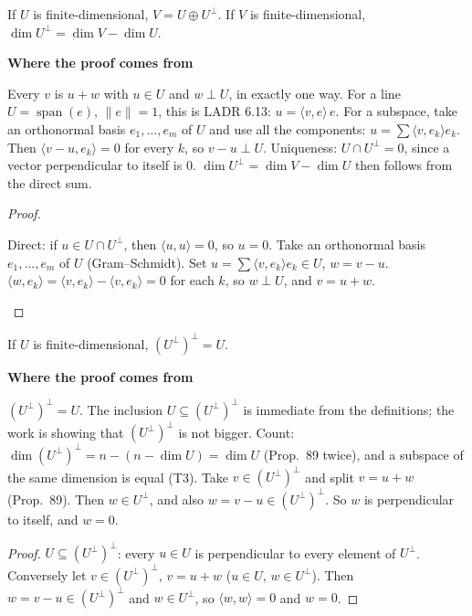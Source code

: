 \documentclass[10pt]{scrartcl}
\DeclareMathOperator{\spn}{span}
\newcommand{\ip}[2]{\langle #1,#2\rangle}
\newenvironment{motive}{\begin{mdframed}[style=thinkbox]\textbf{\color{OliveGreen!75!black}Where the proof comes from}\begin{description}[leftmargin=0.9em,labelindent=0pt,itemsep=2pt,topsep=2pt,font=\normalfont\bfseries\color{OliveGreen!70!black}]}{\end{description}\end{mdframed}}
\newenvironment{steps}{\begin{enumerate}[label=\arabic*.,leftmargin=1.5em,itemsep=2pt,topsep=2pt]}{\end{enumerate}}
\begin{document}
\begin{theorem*}
  If $U$ is finite-dimensional, $V=U\oplus U^\perp$. If $V$ is finite-dimensional, $\dim U^\perp=\dim V-\dim U$.
\end{theorem*}
\begin{motive}
  \ii[Want.] Every $v$ is $u+w$ with $u\in U$ and $w\perp U$, in exactly one way.
  \ii[Know.] For a line $U=\spn(e)$, $\|e\|=1$, this is LADR 6.13: $u=\ip ve\,e$.
   For a subspace, take an orthonormal basis $e_1,\dots,e_m$ of $U$ and use all the components: $u=\sum\ip v{e_k}e_k$. Then $\ip{v-u}{e_k}=0$ for every $k$, so $v-u\perp U$. Uniqueness: $U\cap U^\perp=0$, since a vector perpendicular to itself is $0$.
  \ii[Dimension.] $\dim U^\perp=\dim V-\dim U$ then follows from the direct sum.
\end{motive}
\begin{proof}
  \begin{steps}
    \ii Direct: if $u\in U\cap U^\perp$, then $\ip uu=0$, so $u=0$.
    \ii Take an orthonormal basis $e_1,\dots,e_m$ of $U$ (Gram--Schmidt). Set $u=\sum\ip v{e_k}e_k\in U$, $w=v-u$.
    \ii $\ip w{e_k}=\ip v{e_k}-\ip v{e_k}=0$ for each $k$, so $w\perp U$, and $v=u+w$.
  \end{steps}
\end{proof}

\begin{proposition*}
  If $U$ is finite-dimensional, $(U^\perp)^\perp=U$.
\end{proposition*}
\begin{motive}
  \ii[Want.] $(U^\perp)^\perp=U$. The inclusion $U\subseteq(U^\perp)^\perp$ is immediate from the definitions; the work is showing that $(U^\perp)^\perp$ is not bigger.
   Count: $\dim(U^\perp)^\perp=n-(n-\dim U)=\dim U$ (Prop.~89 twice), and a subspace of the same dimension is equal (T3).
   Take $v\in(U^\perp)^\perp$ and split $v=u+w$ (Prop.~89). Then $w\in U^\perp$, and also $w=v-u\in(U^\perp)^\perp$. So $w$ is perpendicular to itself, and $w=0$.
\end{motive}
\begin{proof}
  $U\subseteq(U^\perp)^\perp$: every $u\in U$ is perpendicular to every element of $U^\perp$. Conversely let $v\in(U^\perp)^\perp$, $v=u+w$ ($u\in U$, $w\in U^\perp$). Then $w=v-u\in(U^\perp)^\perp$ and $w\in U^\perp$, so $\ip ww=0$ and $w=0$.
\end{proof}
\end{document}
